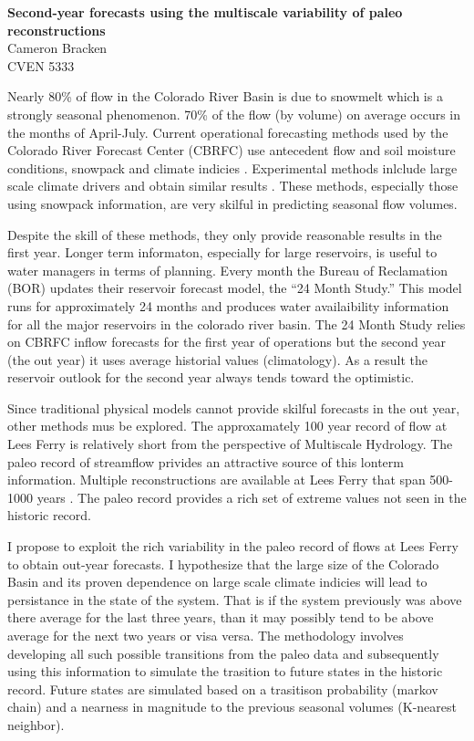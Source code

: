 \documentclass[11pt]{article}
\begin{document}
{\large\bf Second-year forecasts using the multiscale variability of paleo reconstructions}\\
Cameron Bracken\\
CVEN 5333

Nearly 80\% of flow in the Colorado River Basin is due to snowmelt which is a strongly seasonal phenomenon.  70\% of the flow (by volume) on average occurs in the months of April-July.  Current operational forecasting methods used by the Colorado River Forecast Center (CBRFC) use antecedent flow and soil moisture conditions, snowpack and climate indicies \citep{Brandon2005}.  Experimental methods inlclude large scale climate drivers and obtain similar results \citep{Bracken:2010p2682, Regonda2006, Grantz2005}.  These methods, especially those using snowpack information, are very skilful in predicting seasonal flow volumes.  

Despite the skill of these methods, they only provide reasonable results in the first year.  Longer term informaton, especially for large reservoirs, is useful to water managers in terms of planning. Every month the Bureau of Reclamation (BOR) updates their reservoir forecast model, the ``24 Month Study.''  This model runs for approximately 24 months and produces water availaibility information for all the major reservoirs in the colorado river basin.  The 24 Month Study relies on CBRFC inflow forecasts for the first year of operations but the second year (the out year) it uses average historial values (climatology).  As a result the reservoir outlook for the second year always tends toward the optimistic. 

Since traditional physical models cannot provide skilful forecasts in the out year, other methods mus be explored.  The approxamately 100 year record of flow at Lees Ferry is relatively short from the perspective of Multiscale Hydrology.  The paleo record of streamflow privides an attractive source of this lonterm information.  Multiple reconstructions are available at Lees Ferry that span 500-1000 years \citep{Woodhouse:2006p1287, Gangopadhyay:2009p61}.  The paleo record provides a rich set of extreme values not seen in the historic record. 

I propose to exploit the rich variability in the paleo record of flows at Lees Ferry to obtain out-year forecasts.  I hypothesize that the large size of the Colorado Basin and its proven dependence on large scale climate indicies will lead to persistance in the state of the system. That is if the system previously was above there average for the last three years, than it may possibly tend to be  above average for the next two years or visa versa.  The methodology involves developing all such possible transitions from the paleo data and subsequently using this information to simulate the trasition to future states in the historic record.  Future states are simulated based on a trasitison probability (markov chain) and a nearness in magnitude to the previous seasonal volumes (K-nearest neighbor).  


\end{document}
